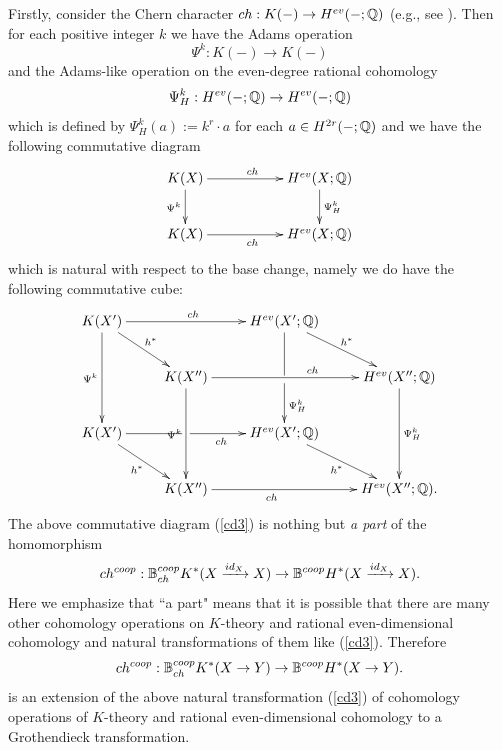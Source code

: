 \documentclass[a4paper]{amsart}
\begin{document}
Firstly, consider the Chern character $ch: K(-) \to H^{ev}(-;\mathbb Q)$ (e.g., see \cite[\S 3 Properties]{nLab}). Then for each positive integer $k$ we have the Adams operation
$$\Psi^k: K(-) \to K(-)$$
and the Adams-like operation on the even-degree rational cohomology
$$\Psi^k_H:H^{ev}(-;\mathbb Q) \to H^{ev}(-;\mathbb Q)$$
which is defined by $\Psi^k_H(a):=k^r \cdot a$ for each $a \in H^{2r}(-;\mathbb Q)$
and we have the following commutative diagram
\begin{equation}\label{cd3}
\xymatrix
{K(X) \ar[d]_{\Psi^k} \ar[rr]^{ch} && H^{ev}(X;\bQ) \ar[d]^{\Psi^k_H}\\
K(X) \ar[rr]_{ch} && H^{ev}(X;\bQ)
}
\end{equation}
which is natural with respect to the base change, namely we do have the following commutative cube:
\begin{equation}\label{ccube2}
\xymatrix
{K(X') \ar[dd]_{\Psi^k} \ar[rd]^{h^*} \ar[rr]^{ch} && H^{ev}(X';\bQ) \ar'[d][dd]^{\Psi^k_H} \ar[rd]^{h^*} \\
& K(X'') \ar[dd]_{ \Psi^k} \ar[rr]^{ \hspace{1cm} ch}  &&  H^{ev}(X'';\bQ) \ar[dd]^{\Psi^k_H} \\
K(X') \ar'[r] [rr]_{ch \quad \quad }  \ar[rd]_{h^*} && H^{ev}(X';\bQ) \ar[rd]_{h^*} \\
& K(X'') \ar[rr] _{ch \quad \quad  \quad }  &&  H^{ev}(X'';\bQ).
}
\end{equation}
The above commutative diagram (\ref{cd3}) is nothing but \emph{a part} of the homomorphism
$$ch^{coop}: \mathbb B^{coop}_{ch}K^*(X \xrightarrow {id_X} X) \to \mathbb B^{coop}H^*(X \xrightarrow {id_X} X).$$
Here we emphasize that ``a part" means that it is possible that there are many other cohomology operations on $K$-theory and rational even-dimensional cohomology and natural transformations of them like (\ref{cd3}). 
Therefore 
$$ch^{coop}: \mathbb B^{coop}_{ch}K^*(X \to Y) \to \mathbb B^{coop}H^*(X \to Y).$$
is an extension of the above natural transformation (\ref{cd3}) of cohomology operations of $K$-theory and rational even-dimensional cohomology to a Grothendieck transformation.
\end{document}
